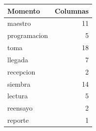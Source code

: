 \begin{tabular}{lr}
\toprule
Momento & Columnas \\
\midrule
maestro & 11 \\
programacion & 5 \\
toma & 18 \\
llegada & 7 \\
recepcion & 2 \\
siembra & 14 \\
lectura & 5 \\
reensayo & 2 \\
reporte & 1 \\
\bottomrule
\end{tabular}
